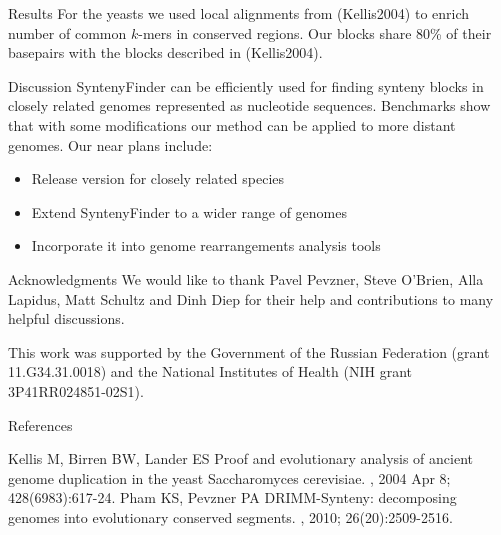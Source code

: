 \documentclass[final,hyperref={pdfpagelabels=false}]{beamer}
\begin{document}
\begin{frame}{}
\begin{columns}[t]
\begin{column}{0.32\linewidth}
\begin{block}{Results}
For the yeasts we used local alignments from (Kellis2004) to enrich number of common \(k\)-mers in conserved regions.
Our blocks share 80\% of their basepairs with the blocks described in (Kellis2004).
\end{block}

\begin{block}{Discussion} \justifying
SyntenyFinder can be efficiently used for finding synteny blocks in closely related genomes represented as nucleotide sequences. 
Benchmarks show that with some modifications our method can be applied to more distant genomes. Our near plans include:
\begin{itemize}
\item Release version for closely related species
\item Extend SyntenyFinder to a wider range of genomes
\item Incorporate it into genome rearrangements analysis tools
\end{itemize}
\end{block}

\begin{block}{Acknowledgments} \justifying
We would like to thank Pavel Pevzner, Steve O'Brien, Alla Lapidus, Matt Schultz and Dinh Diep
for their help and contributions to many helpful discussions.

This work was supported by the Government of the Russian Federation (grant 11.G34.31.0018)
and the National Institutes of Health (NIH grant 3P41RR024851-02S1).
\end{block}

\begin{block}{References} \justifying
\begin{thebibliography}{10}
\small
\beamertemplatebookbibitems
{}
Kellis M, Birren BW, Lander ES
\newblock Proof and evolutionary analysis of ancient genome duplication in the yeast Saccharomyces cerevisiae.
, 2004 Apr 8; 428(6983):617-24.
\beamertemplatebookbibitems
{}
Pham KS, Pevzner PA
\newblock DRIMM-Synteny: decomposing genomes into evolutionary conserved segments.
, 2010; 26(20):2509-2516.
\end{thebibliography}
\end{block}

\end{column}

\end{columns}

\end{frame}
\end{document}
